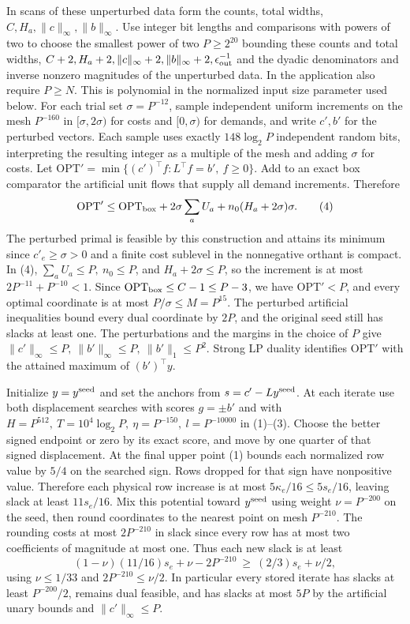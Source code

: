 \documentclass[11pt]{article}
\begin{document}
In scans of these unperturbed data form the counts, total widths, \(C,H_a,\|c\|_\infty,\|b\|_\infty\). Use integer bit lengths and comparisons with powers of two to choose the smallest power of two \(P\ge2^{20}\) bounding these counts and total widths, \(C+2,H_a+2,\|c\|_\infty+2,\|b\|_\infty+2,\epsilon_{\rm out}^{-1}\) and the dyadic denominators and inverse nonzero magnitudes of the unperturbed data. In the application also require \(P\ge N\). This is polynomial in the normalized input size parameter used below. For each trial set \(\sigma=P^{-12}\), sample independent uniform increments on the mesh \(P^{-160}\) in \([\sigma,2\sigma)\) for costs and \([0,\sigma)\) for demands, and write \(c',b'\) for the perturbed vectors. Each sample uses exactly \(148\log_2 P\) independent random bits, interpreting the resulting integer as a multiple of the mesh and adding \(\sigma\) for costs. Let \(\mathrm{OPT}'=\min\{(c')^\top f:L^\top f=b',\ f\ge0\}\). Add to an exact box comparator the artificial unit flows that supply all demand increments. Therefore
\[
 \mathrm{OPT}'\le \mathrm{OPT}_{\rm box}
                      +2\sigma\sum_a U_a+n_0(H_a+2\sigma)\sigma .     \tag{4}
\]
The perturbed primal is feasible by this construction and attains its minimum since \(c'_e\ge\sigma>0\) and a finite cost sublevel in the nonnegative orthant is compact. In (4), \(\sum_a U_a\le P,\ n_0\le P\), and \(H_a+2\sigma\le P\), so the increment is at most \(2P^{-11}+P^{-10}<1\). Since \(\mathrm{OPT}_{\rm box}\le C-1\le P-3\), we have \(\mathrm{OPT}'<P\), and every optimal coordinate is at most \(P/\sigma\le M=P^{15}\). The perturbed artificial inequalities bound every dual coordinate by \(2P\), and the original seed still has slacks at least one. The perturbations and the margins in the choice of \(P\) give \(\|c'\|_\infty\le P,\ \|b'\|_\infty\le P,\ \|b'\|_1\le P^2\). Strong LP duality identifies \(\mathrm{OPT}'\) with the attained maximum of \((b')^\top y\).

Initialize \(y=y^{\rm seed}\) and set the anchors from \(s=c'-Ly^{\rm seed}\). At each iterate use both displacement searches with scores \(g=\pm b'\) and with \(H=P^{512},\ T=10^4\log_2 P,\ \eta=P^{-150},\ l=P^{-10000}\) in (1)--(3). Choose the better signed endpoint or zero by its exact score, and move by one quarter of that signed displacement. At the final upper point (1) bounds each normalized row value by \(5/4\) on the searched sign. Rows dropped for that sign have nonpositive value. Therefore each physical row increase is at most \(5\kappa_e/16\le5s_e/16\), leaving slack at least \(11s_e/16\). Mix this potential toward \(y^{\rm seed}\) using weight \(\nu=P^{-200}\) on the seed, then round coordinates to the nearest point on mesh \(P^{-210}\). The rounding costs at most \(2P^{-210}\) in slack since every row has at most two coefficients of magnitude at most one. Thus each new slack is at least
\[
(1-\nu)(11/16)s_e+\nu-2P^{-210}\ \ge\ (2/3)s_e+\nu/2,
\]
using \(\nu\le 1/33\) and \(2P^{-210}\le\nu/2\). In particular every stored iterate has slacks at least \(P^{-200}/2\), remains dual feasible, and has slacks at most \(5P\) by the artificial unary bounds and \(\|c'\|_\infty\le P\).
\end{document}
